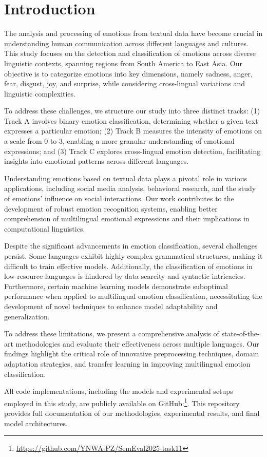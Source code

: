 \section{Introduction}
The analysis and processing of emotions from textual data have become crucial in understanding human communication across different languages and cultures. This study focuses on the detection and classification of emotions across diverse linguistic contexts, spanning regions from South America to East Asia. Our objective is to categorize emotions into key dimensions, namely sadness, anger, fear, disgust, joy, and surprise, while considering cross-lingual variations and linguistic complexities.

To address these challenges, we structure our study into three distinct tracks: (1) Track A involves binary emotion classification, determining whether a given text expresses a particular emotion; (2) Track B measures the intensity of emotions on a scale from 0 to 3, enabling a more granular understanding of emotional expressions; and (3) Track C explores cross-lingual emotion detection, facilitating insights into emotional patterns across different languages.

Understanding emotions based on textual data plays a pivotal role in various applications, including social media analysis, behavioral research, and the study of emotions' influence on social interactions. Our work contributes to the development of robust emotion recognition systems, enabling better comprehension of multilingual emotional expressions and their implications in computational linguistics.

Despite the significant advancements in emotion classification, several challenges persist. Some languages exhibit highly complex grammatical structures, making it difficult to train effective models. Additionally, the classification of emotions in low-resource languages is hindered by data scarcity and syntactic intricacies. Furthermore, certain machine learning models demonstrate suboptimal performance when applied to multilingual emotion classification, necessitating the development of novel techniques to enhance model adaptability and generalization.

To address these limitations, we present a comprehensive analysis of state-of-the-art methodologies and evaluate their effectiveness across multiple languages. Our findings highlight the critical role of innovative preprocessing techniques, domain adaptation strategies, and transfer learning in improving multilingual emotion classification.

All code implementations, including the models and experimental setups employed in this study, are publicly available on GitHub:\footnote{\url{https://github.com/YNWA-PZ/SemEval2025-task11}}. This repository provides full documentation of our methodologies, experimental results, and final model architectures.